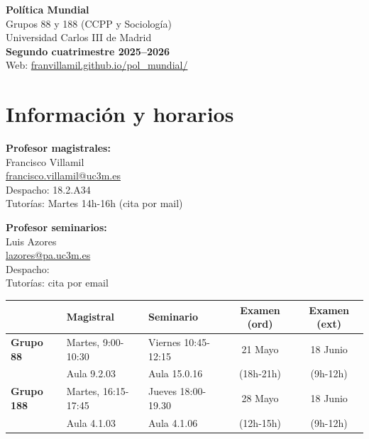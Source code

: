 \documentclass[12pt, a4paper]{article}
\begin{document}
\begin{center}
{\LARGE\bfseries Política Mundial}\\\vspace{10pt}
Grupos 88 y 188 (CCPP y Sociología)\\
Universidad Carlos III de Madrid\\\vspace{10pt}
{\large\bfseries Segundo cuatrimestre 2025--2026}\\\vspace{15pt}
Web: \href{https://franvillamil.github.io/pol_mundial/}{franvillamil.github.io/pol\_mundial/}
\end{center}

\section{Información y horarios}

\begin{minipage}{0.49\textwidth}
\flushleft
\textbf{Profesor magistrales:}\\
Francisco Villamil\\
\href{francisco.villamil@uc3m.es}{francisco.villamil@uc3m.es}\\
Despacho: 18.2.A34\\
Tutorías: Martes 14h-16h (cita por mail)
\end{minipage}\hfill
\begin{minipage}{0.49\textwidth}
\flushleft
\textbf{Profesor seminarios:}\\
Luis Azores\\
\href{lazores@pa.uc3m.es}{lazores@pa.uc3m.es}\\
Despacho:\\
Tutorías: cita por email
\end{minipage}

\vspace{15pt}

\begin{center}
\begin{tabular}{|l|ll|cc|}
\hline
& \textbf{Magistral} & \textbf{Seminario} & \textbf{Examen} (ord) & \textbf{Examen} (ext) \\
\hline
\textbf{Grupo 88} & Martes, 9:00-10:30 & Viernes 10:45-12:15 & 21 Mayo & 18 Junio \\
& Aula 9.2.03 & Aula 15.0.16 & (18h-21h) & (9h-12h) \\
\hline
\textbf{Grupo 188} & Martes, 16:15-17:45 & Jueves 18:00-19.30 & 28 Mayo & 18 Junio \\
& Aula 4.1.03 & Aula 4.1.06 & (12h-15h) & (9h-12h) \\
\hline
\end{tabular}
\end{center}
\end{document}
